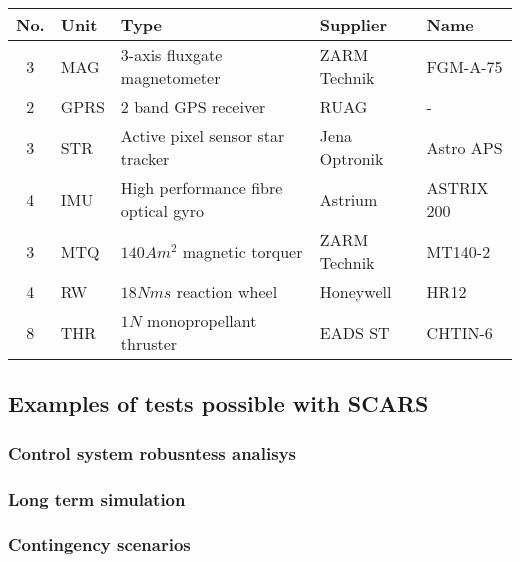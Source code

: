     \begin{center}    
        \begin{tabular}{ c l l l l }
            No. & Unit & Type & Supplier & Name \\ \hline
            3 & MAG & 3-axis fluxgate magnetometer & ZARM Technik & FGM-A-75 \\
            2 & GPRS & 2 band GPS receiver & RUAG & - \\
            3 & STR  & Active pixel sensor star tracker & Jena Optronik & Astro APS \\
            4 & IMU & High performance fibre optical gyro & Astrium & ASTRIX 200 \\
            3 & MTQ & $140 Am^2$ magnetic torquer & ZARM Technik & MT140-2\\
            4 & RW & $18 Nms$ reaction wheel & Honeywell & HR12 \\
            8 & THR & $1N$ monopropellant thruster & EADS ST &CHTIN-6
        \end{tabular}
    \end{center}\label{table:sentinel-adcs}

\subsection{Examples of tests possible with SCARS}

\subsubsection{Control system robusntess analisys}

\subsubsection{Long term simulation}

\subsubsection{Contingency scenarios}
